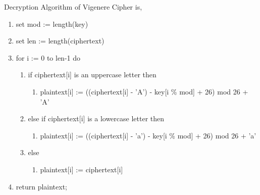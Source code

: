 Decryption Algorithm of Vigenere Cipher is,
\begin{enumerate}
  \item set mod := length(key)
  \item set len := length(ciphertext)
  \item for i := 0 to len-1 do
  \begin{enumerate}
    \item if ciphertext[i] is an uppercase letter then
    \begin{enumerate}
      \item plaintext[i] := ((ciphertext[i] - 'A') - key[i \% mod] + 26) mod 26 + 'A'
    \end{enumerate}
    \item else if ciphertext[i] is a lowercase letter then
    \begin{enumerate}
      \item plaintext[i] := ((ciphertext[i] - 'a') - key[i \% mod] + 26) mod 26 + 'a'
    \end{enumerate}
    \item else
    \begin{enumerate}
      \item plaintext[i] := ciphertext[i]
    \end{enumerate}
  \end{enumerate}
  \item return plaintext;
\end{enumerate}




